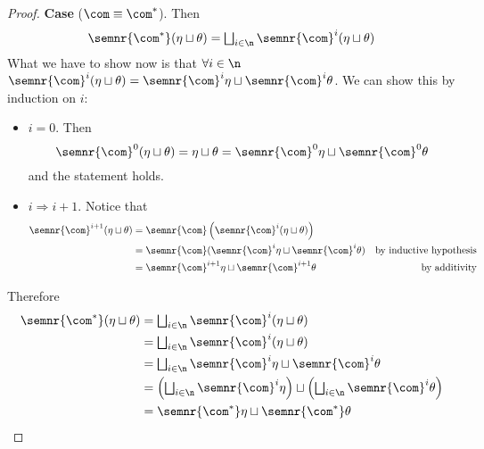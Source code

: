 \begin{proof}
  \noindent
  \textbf{Case}  (\(\com \equiv \com^*\)).
  Then
  \begin{equation*}
    \semnr{\com^*}(\eta\sqcup\theta) = \textstyle \bigsqcup_{i\in\n} \semnr{\com}^i(\eta \sqcup \theta) \\
  \end{equation*}
  What we have to show now is that \(\forall i \in \n\)
  \(\semnr{\com}^i(\eta \sqcup \theta) = \semnr{\com}^i \eta \sqcup
  \semnr{\com}^i\theta\). We can show this by induction on \(i\):
  \begin{itemize}
    \item  \(i=0\). Then
    \begin{equation*}
      \semnr{\com}^0(\eta\sqcup\theta) = \eta\sqcup\theta = \semnr{\com}^0\eta \sqcup \semnr{\com}^0\theta
    \end{equation*}
    and the statement holds.
    \item  \(i \Rightarrow i + 1\). Notice that
    \begin{align*}
      \semnr{\com}^{i+1}(\eta \sqcup \theta) & = \semnr{\com}\left(\semnr{\com}^i(\eta \sqcup \theta)\right) \\
                                             & = \semnr{\com}(\semnr{\com}^i\eta \sqcup \semnr{\com}^i\theta) & \text{by inductive hypothesis} \\
                                             & = \semnr{\com}^{i+1}\eta \sqcup \semnr{\com}^{i+1}\theta & \text{by additivity}
    \end{align*}
  \end{itemize}
  Therefore
  \begin{align*}
    \semnr{\com^*}(\eta\sqcup\theta) & = \textstyle \bigsqcup_{i\in\n} \semnr{\com}^i(\eta \sqcup \theta) \\
                                     & = \textstyle \bigsqcup_{i\in\n}\semnr{\com}^i(\eta \sqcup \theta) \\
                                     & = \textstyle \bigsqcup_{i\in\n}\semnr{\com}^i\eta \sqcup \semnr{\com}^i\theta \\
                                     & = \left(\textstyle \bigsqcup_{i\in\n} \semnr{\com}^i\eta\right) \sqcup \left(\textstyle \bigsqcup_{i\in\n} \semnr{\com}^i\theta\right) \\
                                     & = \semnr{\com^*} \eta \sqcup \semnr{\com^*}\theta
  \end{align*}
\end{proof}

